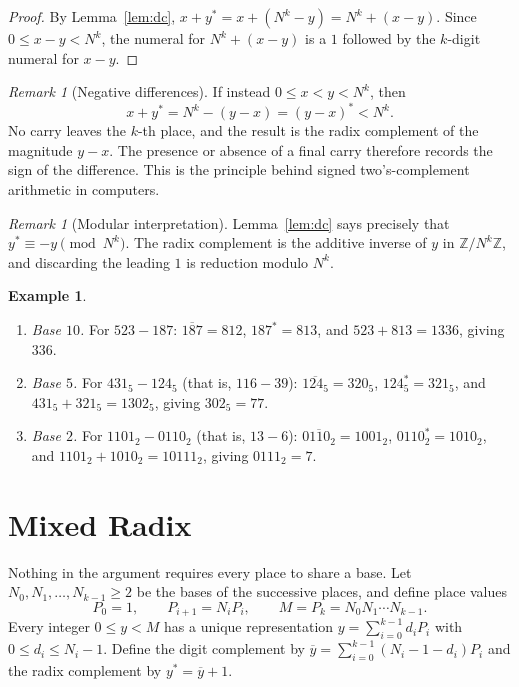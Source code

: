 \documentclass[11pt]{amsart}
\theoremstyle{definition}
\newtheorem{example}[theorem]{Example}
\theoremstyle{remark}
\newtheorem{remark}[theorem]{Remark}
\newcommand{\dc}[1]{\overline{#1}}   %
\newcommand{\rc}[1]{#1^{\ast}}       %
\begin{document}
\begin{proof}
By Lemma~\ref{lem:dc}, $x + \rc{y} = x + (N^k - y) = N^k + (x - y)$. Since
$0 \le x - y < N^k$, the numeral for $N^k + (x - y)$ is a $1$ followed by the
$k$-digit numeral for $x - y$.
\end{proof}

\begin{remark}[Negative differences]
If instead $0 \le x < y < N^k$, then
\[
  x + \rc{y} = N^k - (y - x) = \rc{(y-x)} < N^k .
\]
No carry leaves the $k$-th place, and the result is the radix complement of the
magnitude $y - x$. The presence or absence of a final carry therefore records the
sign of the difference. This is the principle behind signed two's-complement
arithmetic in computers.
\end{remark}

\begin{remark}[Modular interpretation]
Lemma~\ref{lem:dc} says precisely that $\rc{y} \equiv -y \pmod{N^k}$. The radix
complement is the additive inverse of $y$ in $\mathbb{Z}/N^k\mathbb{Z}$, and
discarding the leading $1$ is reduction modulo $N^k$.
\end{remark}

\begin{example}
\leavevmode
\begin{enumerate}
\item \emph{Base $10$.} For $523 - 187$: $\dc{187} = 812$, $\rc{187} = 813$, and
  $523 + 813 = 1336$, giving $336$.
\item \emph{Base $5$.} For $431_5 - 124_5$ (that is, $116 - 39$):
  $\dc{124_5} = 320_5$, $\rc{124_5} = 321_5$, and $431_5 + 321_5 = 1302_5$, giving
  $302_5 = 77$.
\item \emph{Base $2$.} For $1101_2 - 0110_2$ (that is, $13 - 6$):
  $\dc{0110_2} = 1001_2$, $\rc{0110_2} = 1010_2$, and $1101_2 + 1010_2 = 10111_2$,
  giving $0111_2 = 7$.
\end{enumerate}
\end{example}

\section{Mixed Radix}\label{sec:mixed}

Nothing in the argument requires every place to share a base. Let
$N_0, N_1, \dots, N_{k-1} \ge 2$ be the bases of the successive places, and define
place values
\[
  P_0 = 1, \qquad P_{i+1} = N_i P_i, \qquad M = P_k = N_0 N_1 \cdots N_{k-1}.
\]
Every integer $0 \le y < M$ has a unique representation
$y = \sum_{i=0}^{k-1} d_i P_i$ with $0 \le d_i \le N_i - 1$. Define the digit
complement by $\dc{y} = \sum_{i=0}^{k-1} (N_i - 1 - d_i) P_i$ and the radix
complement by $\rc{y} = \dc{y} + 1$.
\end{document}
